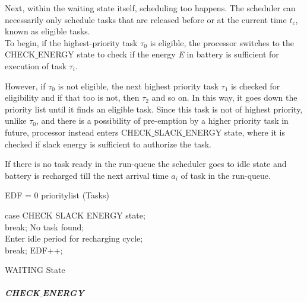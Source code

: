 \documentclass[12pt,hidelinks]{article}
\begin{document}
{Next, within the waiting state itself, scheduling too happens. The scheduler can necessarily only schedule tasks that are released before or at the current time \textit{$t_c$}, known as eligible tasks.\\

To begin, if the highest-priority task {$\tau_0$} is eligible, the processor switches to the CHECK$\_$ENERGY state to check if the energy \textit{E} in battery is sufficient for execution of task $\tau_i$\newline.

However, if {$\tau_0$} is not eligible, the next highest priority task {$\tau_1$} is checked for eligibility and if that too is not, then {$\tau_2$} and so on. In this way, it goes down the priority list until it finds an eligible task. Since this task is not of highest priority, unlike {$\tau_0$}, and there is a possibility of pre-emption by a higher priority task in future, processor instead enters CHECK$\_$SLACK$\_$ENERGY state, where it is checked if slack energy is sufficient to authorize the task.\newline

If there is no task ready in the run-queue the scheduler goes to idle state and battery is recharged till the next arrival time {$a_i$} of task in the run-queue.

\begin{algorithm}[H]
\DontPrintSemicolon
  EDF = 0 
   prioritylist \gets {}(Tasks)
  
  
  \Else 
         {    
        {
        	{case CHECK SLACK ENERGY state;\\
        	break;}
        	{No task found;\\
        	Enter idle period for recharging cycle;\\
        	break;}
        	EDF++;\\
        }
    }
\caption{WAITING State}
\end{algorithm}

\newline
\subparagraph{CHECK$\_$ENERGY}\hfill \label{SlackMethodEnergy}
\newline

}
\end{document}
